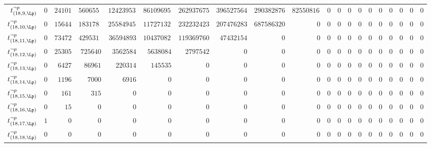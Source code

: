 \begin{tabular}{r|rrrrrrrrrrrrrrrrrrr}
  $t^{\neg p}_{(18,9,\Lp)}$ & $0$ & $241011$ & $56065541$ & $1242395304$ & $8610969527$ & $26293767505$ & $39652756449$ & $29038287698$ & $8255081601$ & $0$ & $0$ & $0$ & $0$ & $0$ & $0$ & $0$ & $0$ & $0$ & $0$ \\
  $t^{\neg p}_{(18,10,\Lp)}$ & $0$ & $156446$ & $18317888$ & $255849453$ & $1172713240$ & $2322324230$ & $2074762836$ & $687586320$ & $0$ & $0$ & $0$ & $0$ & $0$ & $0$ & $0$ & $0$ & $0$ & $0$ & $0$ \\
  $t^{\neg p}_{(18,11,\Lp)}$ & $0$ & $73472$ & $4295314$ & $36594893$ & $104370822$ & $119369760$ & $47432154$ & $0$ & $0$ & $0$ & $0$ & $0$ & $0$ & $0$ & $0$ & $0$ & $0$ & $0$ & $0$ \\
  $t^{\neg p}_{(18,12,\Lp)}$ & $0$ & $25305$ & $725640$ & $3562584$ & $5638084$ & $2797542$ & $0$ & $0$ & $0$ & $0$ & $0$ & $0$ & $0$ & $0$ & $0$ & $0$ & $0$ & $0$ & $0$ \\
  $t^{\neg p}_{(18,13,\Lp)}$ & $0$ & $6427$ & $86961$ & $220314$ & $145535$ & $0$ & $0$ & $0$ & $0$ & $0$ & $0$ & $0$ & $0$ & $0$ & $0$ & $0$ & $0$ & $0$ & $0$ \\
  $t^{\neg p}_{(18,14,\Lp)}$ & $0$ & $1196$ & $7000$ & $6916$ & $0$ & $0$ & $0$ & $0$ & $0$ & $0$ & $0$ & $0$ & $0$ & $0$ & $0$ & $0$ & $0$ & $0$ & $0$ \\
  $t^{\neg p}_{(18,15,\Lp)}$ & $0$ & $161$ & $315$ & $0$ & $0$ & $0$ & $0$ & $0$ & $0$ & $0$ & $0$ & $0$ & $0$ & $0$ & $0$ & $0$ & $0$ & $0$ & $0$ \\
  $t^{\neg p}_{(18,16,\Lp)}$ & $0$ & $15$ & $0$ & $0$ & $0$ & $0$ & $0$ & $0$ & $0$ & $0$ & $0$ & $0$ & $0$ & $0$ & $0$ & $0$ & $0$ & $0$ & $0$ \\
  $t^{\neg p}_{(18,17,\Lp)}$ & $1$ & $0$ & $0$ & $0$ & $0$ & $0$ & $0$ & $0$ & $0$ & $0$ & $0$ & $0$ & $0$ & $0$ & $0$ & $0$ & $0$ & $0$ & $0$ \\
  $t^{\neg p}_{(18,18,\Lp)}$ & $0$ & $0$ & $0$ & $0$ & $0$ & $0$ & $0$ & $0$ & $0$ & $0$ & $0$ & $0$ & $0$ & $0$ & $0$ & $0$ & $0$ & $0$ & $0$ \\
\end{tabular}
